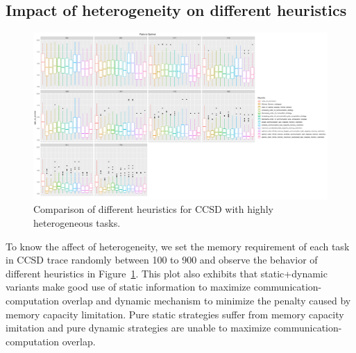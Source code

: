 \documentclass[runningheads]{llncs} %
\begin{document}
\subsection{Impact of heterogeneity on different heuristics}

	\begin{figure}[htb]
	\includegraphics[scale=0.3]{../ExperimentalResults/ccsd-random/ratio_to_optimal_ccsd_random.pdf}
	\caption{Comparison of different heuristics for CCSD with highly heterogeneous tasks.}
	\label{fig:ratio_to_optimal_ccsd_random}
	\end{figure}	


To know the affect of heterogeneity, we set the memory requirement of each task in CCSD trace randomly between 100 to 900 and observe the behavior of different heuristics in  Figure~\ref{fig:ratio_to_optimal_ccsd_random}. This plot also exhibits that static+dynamic variants make good use of static information to maximize communication-computation overlap and dynamic mechanism to minimize the penalty caused by memory capacity limitation. Pure static strategies suffer from memory capacity imitation and pure dynamic strategies are unable to maximize communication-computation overlap.

\end{document}
